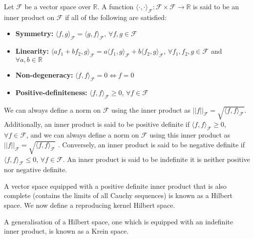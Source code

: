 \begin{definition}
	Let $\mathcal F$ be a vector space over $\mathbb R$. A function $\langle\cdot,\cdot\rangle_{\mathcal F}:\mathcal F \times \mathcal F \rightarrow \mathbb R$ is said to be an inner product on $\mathcal F$ if all of the following are satisfied:
	\begin{itemize}
	\vspace{-1mm}
	\item \textbf{Symmetry:} $\langle f, g\rangle_{\mathcal F} = \langle g, f	\rangle_{\mathcal F}$, $\forall f,g \in \mathcal F$
	\vspace{-1mm}
	\item \textbf{Linearity:} $\langle a f_1 + b f_2, g\rangle_{\mathcal F} = a\langle f_1,g \rangle_{\mathcal F} + b\langle f_2,g \rangle_{\mathcal F}$, $\forall f_1, f_2, g \in \mathcal F$ and $\forall a,b \in \mathbb R$
	\vspace{-1mm}
	\item \textbf{Non-degeneracy:} $\langle f, f\rangle_{\mathcal F} = 0 \Leftrightarrow f=0$
	\vspace{-1mm}
	\item \textbf{Positive-definiteness:} $\langle f, f\rangle_{\mathcal F} \geq 0$, $\forall f \in \mathcal F$
	\end{itemize}
	\vspace{-1mm}	
	We can always define a norm on $\mathcal F$ using the inner product as $||f||_{\mathcal F} = \sqrt{\langle f, f\rangle_{\mathcal F}}$.
	Additionally, an inner product is said to be positive definite if $\langle f, f\rangle_{\mathcal F} \geq 0$, $\forall f \in \mathcal F$, and we can always define a norm on $\mathcal F$ using this inner product as $||f||_{\mathcal F} = \sqrt{\langle f, f\rangle_{\mathcal F}}$ . Conversely, an inner product is said to be negative definite if $\langle f, f\rangle_{\mathcal F} \leq 0$, $\forall f \in \mathcal F$. An inner product is said to be indefinite it is neither positive nor negative definite.
\end{definition}

A vector space equipped with a positive definite inner product that is also complete (contains the limits of all Cauchy sequences) is known as a Hilbert space. We now define a reproducing kernel Hilbert space.

A generalisation of a Hilbert space, one which is equipped with an indefinite inner product, is known as a Krein space.

